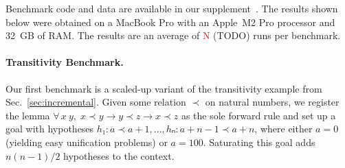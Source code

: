 \documentclass[runningheads]{llncs}
\newcommand{\All}[2]{\ensuremath{\forall\, #1,\; #2}}
\begin{document}
Benchmark code and data are available in our supplement~\cite{supplement}.
The results shown below were obtained on a MacBook Pro with an Apple~M2 Pro processor and \SI{32}{GB} of RAM.
The results are an average of \textcolor{red}{N} (TODO) runs per benchmark.

\paragraph{Transitivity Benchmark.}
Our first benchmark is a scaled-up variant of the transitivity example from Sec.~\ref{sec:incremental}.
Given some relation $≺$ on natural numbers, we register the lemma $\All{x~y}{x ≺ y → y ≺ z → x ≺ z}$ as the sole forward rule and set up a goal with hypotheses $h₁ : a ≺ a + 1, \dots, hₙ : a + n - 1 ≺ a + n$, where either $a = 0$ (yielding easy unification problems) or $a = 100$.
Saturating this goal adds $n(n-1)/2$ hypotheses to the context.
\end{document}

